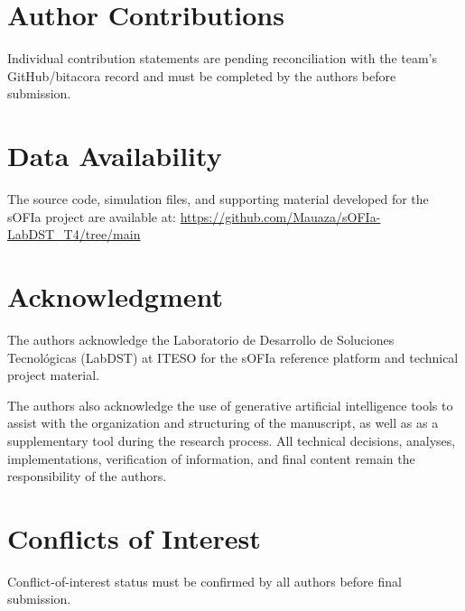 \documentclass[lettersize,journal]{IEEEtran}
\begin{document}
\FloatBarrier


\section*{Author Contributions}
Individual contribution statements are pending reconciliation with the team's GitHub/bitacora record and must be completed by the authors before submission.

\section*{Data Availability}
The source code, simulation files, and supporting material developed for the sOFIa project are available at:
\url{https://github.com/Mauaza/sOFIa-LabDST_T4/tree/main}

\section*{Acknowledgment}
The authors acknowledge the Laboratorio de Desarrollo de Soluciones Tecnol\'ogicas (LabDST) at ITESO for the sOFIa reference platform and technical project material. 

The authors also acknowledge the use of generative artificial intelligence tools to assist with the organization and structuring of the manuscript, as well as as a supplementary tool during the research process. All technical decisions, analyses, implementations, verification of information, and final content remain the responsibility of the authors.

\section*{Conflicts of Interest}
Conflict-of-interest status must be confirmed by all authors before final submission.

\balance


\end{document}
